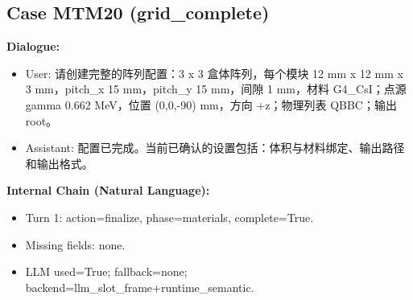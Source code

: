 \documentclass[11pt]{ctexart}
\begin{document}
\subsection{Case MTM20 (grid\_complete)}
\textbf{Dialogue:}
\begin{itemize}
\item User: 请创建完整的阵列配置：3 x 3 盒体阵列，每个模块 12 mm x 12 mm x 3 mm，pitch\_x 15 mm，pitch\_y 15 mm，间隙 1 mm，材料 G4\_CsI；点源 gamma 0.662 MeV，位置 (0,0,-90) mm，方向 +z；物理列表 QBBC；输出 root。
\item Assistant: 配置已完成。当前已确认的设置包括：体积与材料绑定、输出路径和输出格式。
\end{itemize}
\textbf{Internal Chain (Natural Language):}
\begin{itemize}
\item Turn 1: action=finalize, phase=materials, complete=True.
\item Missing fields: none.
\item LLM used=True; fallback=none; backend=llm\_slot\_frame+runtime\_semantic.
\end{itemize}
\end{document}
